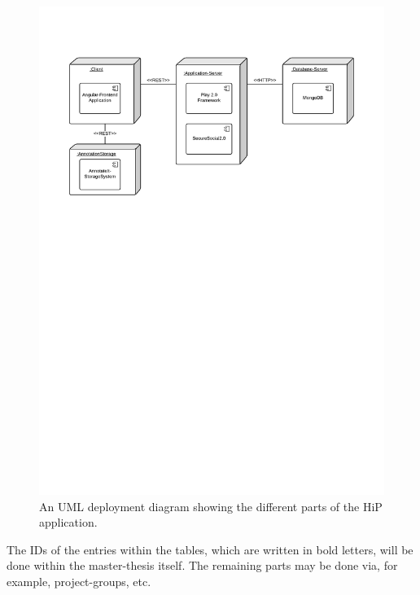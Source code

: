 \begin{figure}[ht]
\centerline{\includegraphics[width=1.3\textwidth]{gfx/HiPDeployment}}
\caption{An \ac{UML} deployment diagram showing the different parts of the \ac{HiP} application.}
\label{UML:deploymentDiagram}
\end{figure}

The IDs of the entries within the tables, which are written in bold letters, will be done within the master-thesis itself. The remaining parts may be done via, for example, project-groups, etc. 

